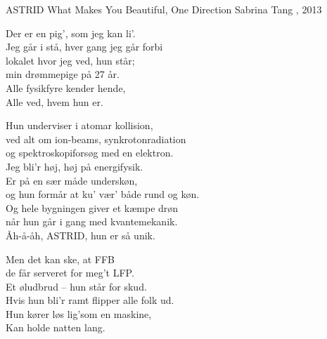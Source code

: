 \begin{song}{ASTRID}
  {} %
  {What Makes You Beautiful, One Direction} %
  {Sabrina Tang} %
  {\TKET{}, 2013} %
  {\NotCCLIed} %

  \begin{SBVerse}
    Der er en pig’, som jeg kan li’.\\
    Jeg går i stå, hver gang jeg går forbi\\
    lokalet hvor jeg ved, hun står;\\
    min drømmepige på 27 år.\\\medskip
    Alle fysikfyre kender hende,\\
    Alle ved, hvem hun er.
  \end{SBVerse}

  \begin{SBChorus}
    Hun underviser i atomar kollision,\\
    ved alt om ion-beams, synkrotonradiation\\
    og spektroskopiforsøg med en elektron.\\
    Jeg bli’r høj, høj på energifysik.\\\medskip
    Er på en sær måde underskøn,\\
    og hun formår at ku’ vær’ både rund og køn.\\
    Og hele bygningen giver et kæmpe drøn\\
    når hun går i gang med kvantemekanik.\\
    Åh-å-åh, ASTRID, hun er så unik.
  \end{SBChorus}

  \begin{SBVerse}
    Men det kan ske, at FFB\\
    de får serveret for meg’t LFP.\\
    Et øludbrud – hun står for skud.\\
    Hvis hun bli’r ramt flipper alle folk ud.\\\medskip
    Hun kører løs lig’som en maskine,\\
    Kan holde natten lang.
  \end{SBVerse}


\end{song}
